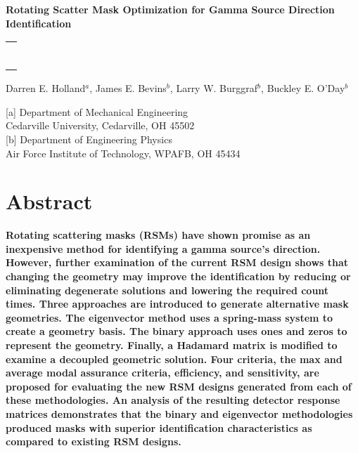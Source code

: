 \documentclass[twocolumn,10pt,final]{asme2ej}
\begin{document}
\begin{center}

\textbf{\large{Rotating Scatter Mask Optimization for Gamma Source Direction Identification}}

\noindent
\begin{tabular}{l}
\rule{3.2in}{0.02in}
\end{tabular}

{Darren E. Holland$^a$, James E. Bevins$^b$, Larry W. Burggraf$^b$, Buckley E. O'Day$^b$}
\vspace{0.1in}

{[a] Department of Mechanical Engineering\\
	Cedarville University, Cedarville, OH 45502\\}
{[b] Department of Engineering Physics\\
	Air Force Institute of Technology,	WPAFB, OH 45434\\}

\end{center}

\vspace{-0.4 cm}
\section*{Abstract}
\textbf{
Rotating scattering masks (RSMs) have shown promise as an inexpensive method for identifying a gamma source's direction.  
However, further examination of the current RSM design shows that changing the geometry may improve the identification by 
reducing or eliminating degenerate solutions and lowering the required count times.  
Three approaches are introduced to generate alternative mask geometries.
The eigenvector method uses a spring-mass system to create a geometry basis.  The binary approach uses ones and zeros to represent the geometry.  
Finally, a Hadamard matrix is modified to examine a decoupled geometric solution.   
Four criteria, the max and average modal assurance criteria, efficiency, and sensitivity, are proposed for evaluating the new RSM designs generated from each of these methodologies.
An analysis of the resulting detector response matrices demonstrates that the binary and eigenvector methodologies produced masks with
superior identification characteristics as compared to existing RSM designs.}

\vspace{-0.3 cm}
\end{document}
